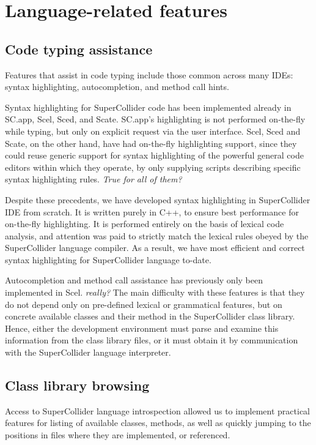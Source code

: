 \documentclass[11pt,a4paper]{article}
\begin{document}
\section{Language-related features}

\subsection{Code typing assistance}

Features that assist in code typing include those common across many IDEs: syntax highlighting,
autocompletion, and method call hints.

Syntax highlighting for SuperCollider code has been implemented already in SC.app, Scel, Sced, and
Scate. SC.app's highlighting is not performed on-the-fly while typing, but only on explicit request
via the user interface. Scel, Sced and Scate, on the other hand, have had on-the-fly highlighting
support, since they could reuse generic support for syntax highlighting of the powerful general code
editors within which they operate, by only supplying scripts describing specific syntax highlighting
rules. \emph{True for all of them?}

Despite these precedents, we have developed syntax highlighting in SuperCollider IDE from scratch.
It is written purely in C++, to ensure best performance for on-the-fly highlighting. It is performed
entirely on the basis of lexical code analysis, and attention was paid to strictly match the lexical
rules obeyed by the SuperCollider language compiler. As a result, we have most efficient and correct
syntax highlighting for SuperCollider language to-date.

Autocompletion and method call assistance has previously only been implemented in Scel. \emph{really?}
The main difficulty with these features is that they do not depend only on pre-defined lexical or
grammatical features, but on concrete available classes and their method in the SuperCollider class
library. Hence, either the development environment must parse and examine this information from the
class library files, or it must obtain it by communication with the SuperCollider language
interpreter.

\subsection{Class library browsing}

Access to SuperCollider language introspection allowed us to implement practical features for
listing of available classes, methods, as well as quickly jumping to the positions in files
where they are implemented, or referenced.
\end{document}
